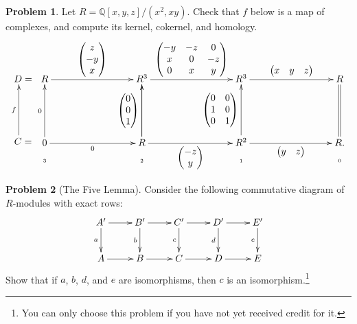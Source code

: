 \documentclass[11pt]{article}
\theoremstyle{definition}
\newtheorem{problem}{Problem}
\begin{document}
\begin{problem}
	Let $R = \mathbb{Q}[x,y,z]/(x^2,xy)$. Check that $f$ below is a map of complexes, and compute its kernel, cokernel, and homology.
	$$\xymatrix@R=2mm{D = \\ \\ \\ \\ \\ C = \ar@<1ex>[uuuuu]^-f} \xymatrix@R=2mm@C=30mm{R \ar[r]^-{\begin{pmatrix} z \\ -y \\ x \end{pmatrix}} & R^3 \ar[r]^-{\begin{pmatrix} -y & -z & 0 \\ x & 0 & -z \\ 0 & x & y \end{pmatrix}
} & R^3 \ar[r]^-{\begin{pmatrix} x & y & z\end{pmatrix}
} & R \\ &&&\\ &&&\\ &&&\\ &&&\\ 0 \ar[r]_-0 \ar[uuuuu]^-{0} & R \ar[uuuuu]^-{\begin{pmatrix} 0 \\ 0 \\ 1 \end{pmatrix}} \ar[r]_-{\begin{pmatrix} -z \\ y \end{pmatrix}}  \ar[uuuuu]^-{} & R^2 \ar[uuuuu]^-{\begin{pmatrix} 0 & 0 \\ 1 & 0 \\ 0 & 1 \end{pmatrix}} \ar[r]_-{\begin{pmatrix} y & z\end{pmatrix}} & R. \ar@{=}[uuuuu] \\
\text{{\tiny 3}} & \text{{\tiny 2}} & \text{{\tiny 1}} & \text{{\tiny 0}}}$$

\end{problem}



\begin{problem}[The Five Lemma]
	Consider the following commutative diagram of $R$-modules with exact rows:
	$$\xymatrix{A' \ar[d]_-a \ar[r] & B' \ar[r] \ar[d]_-b & C' \ar[r] \ar[d]_-c & D' \ar[d]_-d \ar[r] & E' \ar[d]_-e \\
	A \ar[r] & B \ar[r] & C \ar[r] & D \ar[r] & E}$$
	Show that if $a$, $b$, $d$, and $e$ are isomorphisms, then $c$ is an isomorphism.\footnote{You can only choose this problem if you have not yet received credit for it.}
\end{problem}
\end{document}
